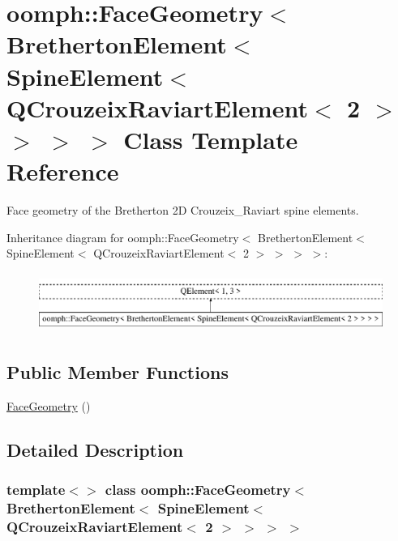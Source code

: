 \hypertarget{classoomph_1_1FaceGeometry_3_01BrethertonElement_3_01SpineElement_3_01QCrouzeixRaviartElement_3_012_01_4_01_4_01_4_01_4}{}\section{oomph\+:\+:Face\+Geometry$<$ Bretherton\+Element$<$ Spine\+Element$<$ Q\+Crouzeix\+Raviart\+Element$<$ 2 $>$ $>$ $>$ $>$ Class Template Reference}
\label{classoomph_1_1FaceGeometry_3_01BrethertonElement_3_01SpineElement_3_01QCrouzeixRaviartElement_3_012_01_4_01_4_01_4_01_4}


Face geometry of the Bretherton 2D Crouzeix\+\_\+\+Raviart spine elements.  


Inheritance diagram for oomph\+:\+:Face\+Geometry$<$ Bretherton\+Element$<$ Spine\+Element$<$ Q\+Crouzeix\+Raviart\+Element$<$ 2 $>$ $>$ $>$ $>$\+:\begin{figure}[H]
\begin{center}
\leavevmode
\includegraphics[height=1.958042cm]{classoomph_1_1FaceGeometry_3_01BrethertonElement_3_01SpineElement_3_01QCrouzeixRaviartElement_3_012_01_4_01_4_01_4_01_4}
\end{center}
\end{figure}
\subsection*{Public Member Functions}
\begin{DoxyCompactItemize}
\item 
\hyperlink{classoomph_1_1FaceGeometry_3_01BrethertonElement_3_01SpineElement_3_01QCrouzeixRaviartElement_3_012_01_4_01_4_01_4_01_4_a0dc4cbff5cdc502a6f653a6682cf7da5}{Face\+Geometry} ()
\end{DoxyCompactItemize}


\subsection{Detailed Description}
\subsubsection*{template$<$$>$\newline
class oomph\+::\+Face\+Geometry$<$ Bretherton\+Element$<$ Spine\+Element$<$ Q\+Crouzeix\+Raviart\+Element$<$ 2 $>$ $>$ $>$ $>$}

